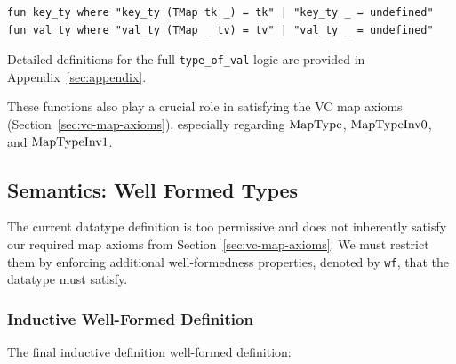 \documentclass[11pt]{article}
\begin{document}
\begin{verbatim}
fun key_ty where "key_ty (TMap tk _) = tk" | "key_ty _ = undefined"
fun val_ty where "val_ty (TMap _ tv) = tv" | "val_ty _ = undefined"
\end{verbatim}

Detailed definitions for the full \texttt{type\_of\_val} logic are provided in Appendix~\ref{sec:appendix}.

These functions also play a crucial role in satisfying the VC map axioms (Section~\ref{sec:vc-map-axioms}),
especially regarding $\operatorname{MapType}$, $\operatorname{MapTypeInv0}$, and $\operatorname{MapTypeInv1}$.



\subsection{Semantics: Well Formed Types}

The current datatype definition is too permissive
and does not inherently satisfy our required map axioms from Section~\ref{sec:vc-map-axioms}.
We must restrict them by enforcing additional well-formedness properties, denoted by \texttt{wf},
that the datatype must satisfy.


\subsubsection{Inductive Well-Formed Definition}
\label{sec:wf-definition}

The final inductive definition well-formed definition:
\end{document}
